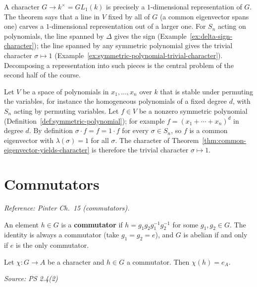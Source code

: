 \documentclass[11pt]{report}
\newcommand{\srcline}[1]{\par\hfill{\footnotesize\textit{Source: #1}}}
\begin{document}
\begin{rembox}\label{rem:one-dimensional-representations}
A character $G \to k^\times = GL_1(k)$ is precisely a $1$-dimensional representation of $G$. The theorem says that a line in $V$ fixed by all of $G$ (a common eigenvector spans one) carves a $1$-dimensional representation out of a larger one. For $S_n$ acting on polynomials, the line spanned by $\Delta$ gives the sign (Example~\ref{ex:delta-sign-character}); the line spanned by any symmetric polynomial gives the trivial character $\sigma \mapsto 1$ (Example~\ref{ex:symmetric-polynomial-trivial-character}). Decomposing a representation into such pieces is the central problem of the second half of the course.
\end{rembox}

\begin{exbox}\label{ex:symmetric-polynomial-trivial-character}
Let $V$ be a space of polynomials in $x_1, \ldots, x_n$ over $k$ that is stable under permuting the variables, for instance the homogeneous polynomials of a fixed degree $d$, with $S_n$ acting by permuting variables. Let $f \in V$ be a nonzero symmetric polynomial (Definition~\ref{def:symmetric-polynomial}); for example $f = (x_1 + \cdots + x_n)^d$ in degree $d$. By definition $\sigma \cdot f = f = 1 \cdot f$ for every $\sigma \in S_n$, so $f$ is a common eigenvector with $\lambda(\sigma) = 1$ for all $\sigma$. The character of Theorem~\ref{thm:common-eigenvector-yields-character} is therefore the trivial character $\sigma \mapsto 1$.
\end{exbox}

\section{Commutators}\label{sec:commutators}

\textit{Reference: Pinter Ch.\ 15 (commutators).}

\begin{defbox}[Commutator]\label{def:commutator}
An element $h \in G$ is a \textbf{commutator} if $h = g_1 g_2 g_1^{-1} g_2^{-1}$ for some $g_1, g_2 \in G$. The identity is always a commutator (take $g_1 = g_2 = e$), and $G$ is abelian if and only if $e$ is the only commutator.
\end{defbox}

\begin{propbox}\label{prop:characters-kill-commutators}
Let $\chi: G \to A$ be a character and $h \in G$ a commutator. Then $\chi(h) = e_A$.
\srcline{PS 2.4(2)}
\end{propbox}
\end{document}
